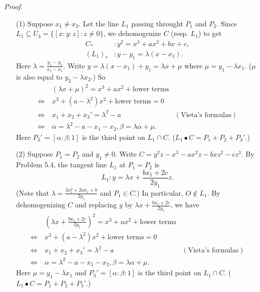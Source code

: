 \documentclass{article}
\begin{document}
\emph{Proof.}
\begin{enumerate}
\item[(1)]
  Suppose $x_1 \neq x_2$.
  Let the line $L_1$ passing throught $P_1$ and $P_2$.
  Since $L_1 \subseteq U_3 = \{ [x:y:z] : z \neq 0 \}$,
  we dehomogenize $C$ (resp. $L_1$) to get
  \begin{align*}
    C_{*}&: y^2 = x^3 + ax^2 + bx + c, \\
    (L_1)_{*}&: y - y_1 = \lambda (x - x_1).
  \end{align*}
  Here $\lambda = \frac{y_2-y_1}{x_2-x_1}$.
  Write $y = \lambda (x - x_1) + y_1 = \lambda x+\mu$ where $\mu = y_1-\lambda x_1$.
  ($\mu$ is also equal to $y_2-\lambda x_2$.)
  So
  \begin{align*}
    & \:
    (\lambda x+\mu)^2 = x^3 + ax^2 + \text{lower terms} \\
    \Longleftrightarrow & \:
    x^3 + (a - \lambda^2) x^2 + \text{lower terms} = 0 \\
    \Longleftrightarrow & \:
    x_1 + x_2 + x_3' = \lambda^2 - a
      & (\text{Vieta's formulas}) \\
    \Longleftrightarrow & \:
    \alpha = \lambda^2 - a - x_1 - x_2, \beta = \lambda \alpha + \mu.
  \end{align*}
  Here $P_3' = [\alpha:\beta:1]$ is the third point on $L_1 \cap C$.
  ($L_1 \bullet C = P_1 + P_2 + P_3'$.)

\item[(2)]
  Suppose $P_1 = P_2$ and $y_1 \neq 0$.
  Write $C = y^2z - x^3 - ax^2z - bxz^2 - cz^3$.
  By Problem 5.4, the tangent line $L_1$ at $P_1 = P_2$ is
  \[
    L_1: y = \lambda x + \frac{bx_1+2c}{2y_1} z.
  \]
  (Note that $\lambda = \frac{3x_1^2+2ax_1+b}{2y_1}$ and $P_1 \in C$.)
  In particular, $O \not\in L_1$.
  By dehomogenizing $C$ and replacing $y$ by $\lambda x + \frac{bx_1+2c}{2y_1}$,
  we have
  \begin{align*}
    & \:
    \left(\lambda x + \frac{bx_1+2c}{2y_1}\right)^2 = x^3 + ax^2 + \text{lower terms} \\
    \Longleftrightarrow & \:
    x^3 + (a - \lambda^2) x^2 + \text{lower terms} = 0 \\
    \Longleftrightarrow & \:
    x_1 + x_2 + x_3' = \lambda^2 - a
      & (\text{Vieta's formulas}) \\
    \Longleftrightarrow & \:
    \alpha = \lambda^2 - a - x_1 - x_2, \beta = \lambda \alpha + \mu.
  \end{align*}
  Here $\mu = y_1-\lambda x_1$ and $P_3' = [\alpha:\beta:1]$ is the third point on $L_1 \cap C$.
  ($L_1 \bullet C = P_1 + P_2 + P_3'$.)


\end{enumerate}
\end{document}
